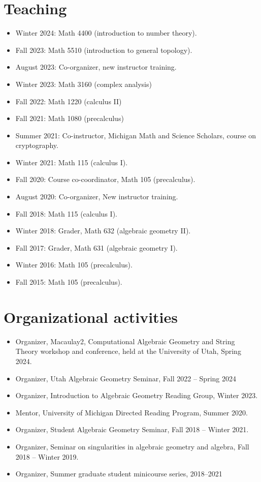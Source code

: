 \documentclass{res}
\begin{document}
\begin{resume}
\section{Teaching}
\begin{itemize}
\item Winter 2024: Math 4400 (introduction to number theory).
\item Fall 2023: Math 5510 (introduction to general topology).
\item August 2023: Co-organizer, new instructor training.
\item Winter 2023: Math 3160 (complex analysis)
\item Fall 2022: Math 1220 (calculus II)
\item Fall 2021: Math 1080 (precalculus)
\item Summer 2021: Co-instructor, Michigan Math and Science Scholars, course on cryptography.
\item Winter 2021: Math 115 (calculus I).
\item Fall 2020: Course co-coordinator, Math 105 (precalculus).
\item August 2020: Co-organizer, New instructor training.
\item Fall 2018:  Math 115 (calculus I).
\item  Winter 2018: Grader, Math 632 (algebraic geometry II).
\item  Fall 2017: Grader, Math 631 (algebraic geometry I).
\item  Winter 2016:  Math 105 (precalculus).
\item  Fall 2015:  Math 105 (precalculus).
\end{itemize}

\section{Organizational activities}
\begin{itemize}
\item Organizer, Macaulay2, Computational Algebraic Geometry and String Theory workshop and conference, held at the University of Utah, Spring 2024.
\item Organizer, Utah Algebraic Geometry Seminar, Fall 2022 -- Spring 2024
\item Organizer, Introduction to Algebraic Geometry Reading Group, Winter 2023.
\item Mentor, University of Michigan Directed Reading Program, Summer 2020.
\item Organizer, Student Algebraic Geometry Seminar, Fall 2018 -- Winter 2021.
\item Organizer, Seminar on singularities in algebraic geometry and  algebra, Fall 2018 -- Winter 2019.
\item Organizer, Summer graduate student minicourse series, 2018--2021
\end{itemize}


\end{resume}
\end{document}
